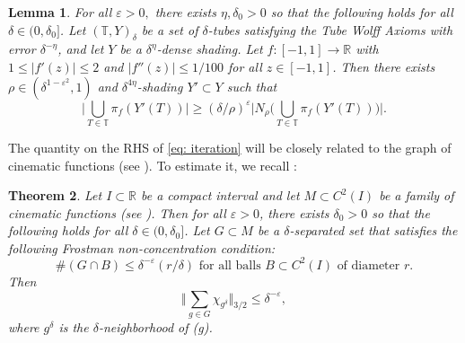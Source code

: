 \documentclass[letterpaper, reqno,11pt]{article}
\numberwithin{equation}{section}
\newcommand{\RR}{\mathbb{R}}
\newcommand{\eps}{\varepsilon}
\newcommand{\tubes}{\mathbb{T}}
\newtheorem{thm}{Theorem}
\numberwithin{thm}{section}
\newtheorem{lem}[thm]{Lemma}
\theoremstyle{remark}
\begin{document}
\begin{lem}\label{lem: strengthenedL32EstimateUpperBd}
For all $\eps>0,$ there exists $\eta,\delta_0>0$ so that the following holds for all $\delta\in(0,\delta_0]$. Let $(\tubes,Y)_\delta$ be a set of $\delta$-tubes satisfying the Tube Wolff Axioms with error $\delta^{-\eta}$, and let $Y$ be a $\delta^\eta$-dense shading. Let $f\colon[-1,1]\to\RR$ with $1\leq |f'(z)|\leq 2$ and $|f''(z)|\leq 1/100$ for all $z\in[-1,1]$. Then there exists $\rho \in (\delta^{1-\eps^2}, 1)$  and $\delta^{4\eta}$-shading $Y'\subset Y$ such that 
\begin{equation}\label{eq: iteration}
\Big| \bigcup_{T\in\tubes}\pi_f (Y'(T))\Big| \geq (\delta/\rho)^{\eps} \Big| N_{\rho}\big( \bigcup_{T\in\tubes}\pi_f (Y'(T)) \big)\Big|.
\end{equation}
\end{lem}

The quantity on the RHS of \eqref{eq: iteration} will be closely related to the graph of cinematic functions (see \cite[Definition 7.1]{WZ}). To estimate it, we recall \cite[Theorem 7.2]{WZ}:

 \begin{thm}\label{thm: cinematic}
     Let $I\subset \mathbb{R}$ be a compact interval and let $M\subset C^2(I)$ be a family of cinematic functions (see \cite[Definition 1.6]{WZ}). Then for all $\eps>0$, there exists $\delta_0>0$ so that the following holds for all $\delta\in (0, \delta_0]$. Let $G\subset M$ be a $\delta$-separated set that satisfies the following Frostman non-concentration condition:
     \begin{equation}\label{nonConcentrationConditionInThmCinematic}
         \#(G\cap B) \leq \delta^{-\eps} (r/\delta) \text{ for all balls } B\subset C^2(I) \text{ of diameter } r. 
     \end{equation}
     Then
     \[
     \Big\Vert\sum_{g\in G}\chi_{g^{\delta}}\Big\Vert_{3/2}\leq \delta^{-\eps},
     \]
     where $g^{\delta}$ is the $\delta$-neighborhood of (g).
 \end{thm}

\end{document}
